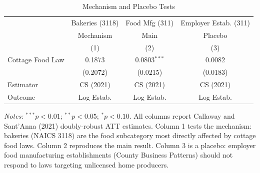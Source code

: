 \begin{table}[htbp]
\centering
\caption{Mechanism and Placebo Tests}
\label{tab:mechanism}
\begin{tabular}{lccc}
\hline\hline
 & Bakeries (3118) & Food Mfg (311) & Employer Estab. (311) \\
 & Mechanism & Main & Placebo \\
 & (1) & (2) & (3) \\
\hline
Cottage Food Law & 0.1873 & 0.0803$^{***}$ & 0.0082 \\
 & (0.2072) & (0.0215) & (0.0183) \\
\hline
Estimator & CS (2021) & CS (2021) & CS (2021) \\
Outcome & Log Estab. & Log Estab. & Log Estab. \\
\hline\hline
\end{tabular}
\begin{tablenotes}[flushleft]\small
\item \textit{Notes:} $^{***}p<0.01$; $^{**}p<0.05$; $^{*}p<0.10$. All columns report Callaway and Sant'Anna (2021) doubly-robust ATT estimates. Column 1 tests the mechanism: bakeries (NAICS 3118) are the food subcategory most directly affected by cottage food laws. Column 2 reproduces the main result. Column 3 is a placebo: employer food manufacturing establishments (County Business Patterns) should not respond to laws targeting unlicensed home producers.
\end{tablenotes}
\end{table}
